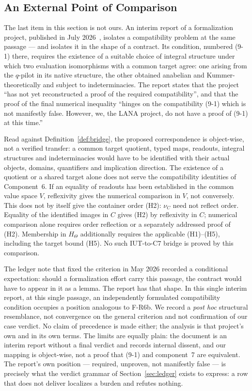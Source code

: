 \documentclass[11pt,a4paper]{article}
\begin{document}
\subsection{An External Point of Comparison}\label{sec:abc-external}

The last item in this section is not ours. An interim report of a formalization
project, published in July 2026~\cite{LANA2026}, isolates a compatibility problem
at the same passage --- and isolates it in the shape of a contract. Its
condition, numbered (9-1) there, requires the existence of a suitable choice of
integral structure under which two evaluation isomorphisms with a common target
agree: one arising from the $q$-pilot in its native structure, the other obtained
anabelian and Kummer-theoretically and subject to indeterminacies. The report
states that the project ``has not yet reconstructed a proof of the required
compatibility'', and that the proof of the final numerical inequality ``hinges on
the compatibility (9-1) which is not manifestly false. However, we, the LANA
project, do not have a proof of (9-1) at this time.''

Read against Definition~\ref{def:bridge}, the proposed correspondence is
object-wise, not a verified transfer: a common target quotient, typed maps,
readouts, integral structures and indeterminacies would have to be identified
with their actual objects, domains, quantifiers and implication direction.
The existence of a quotient or a shared target alone does not serve the
compatibility identities of Component~6. If an equality of readouts has been
established in the common value space $V$, reflexivity gives the numerical
comparison in $V$, not conversely. This does not by itself give the container
order (H2): $\nu_C$ need not reflect order. Equality of the identified images
in $C$ gives (H2) by reflexivity in $C$; numerical comparison alone requires
order reflection or a separately addressed proof of (H2). Membership in
$H_\Theta$ additionally requires the applicable (H1)--(H5), including the
target bound (H5). No such IUT-to-C7 bridge is proved by this comparison.

The ledger note that fixed the criterion in May 2026 recorded a conditional
expectation: should a formalization effort carry this passage, the contract would
have to appear in it as a lemma. The report has that shape. In this single
interim report, at this single passage, an independently formulated
compatibility condition occupies a position analogous to F-R6b. We record a
\textit{post hoc} structural resemblance, not convergence on the general criterion and
not confirmation of our case verdict. No claim of precedence is made either; the
analysis is that project's own and in its own terms.
The limits are equally plain: the document is an interim report without a final
verdict and records internal dissent, and our mapping is object-wise, not a proof
that (9-1) and component~7 are equivalent. The report's own position ---
required, unproven, not manifestly false --- is precisely what the verdict
grammar of Section~\ref{sec:ledger} exists to express: a row that does not
deliver localizes a burden and refutes nothing.
\end{document}
